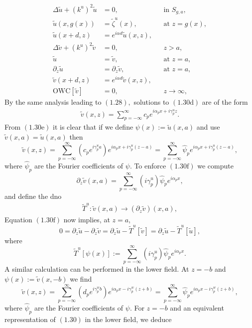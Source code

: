 \begin{subequations}
\begin{align}
\Delta \tilde{u} + (k^u)^2 \tilde{u} &=0,&& \text{in $S_{g,a}$},\\
\tilde{u}(x,g(x))&=\tilde{\zeta}^u(x),&& \text{at $z=g(x)$},\\
\tilde{u}(x+d,z)&=e^{i\alpha d}\tilde{u}(x,z),\\
\Delta \tilde{v} + (k^u)^2 \tilde{v} &=0, && z>a,\\
\tilde{u}&=\tilde{v}, && \text{at $z=a$},\\
\partial_z \tilde{u} &= \partial_z \tilde{v},&& \text{at $z=a$},\\
\tilde{v}(x+d,z)&=e^{i\alpha d}\tilde{v}(x,z),\\
\text{OWC}[\tilde{v}]&=0,&& z\to\infty,
\end{align}
\end{subequations}
By the same analysis leading to $(1.28),$ solutions to $(1.30\text{d})$ are of the form
\begin{align}
\tilde{v}(x,z)=\sum_{p=-\infty}^{\infty}c_pe^{i\alpha_px + i\gamma_p^u z}.   
\end{align}
From $(1.30\text{e})$ it is clear that if we define $\psi(x):=\tilde{u}(x,a)$ and use $\tilde{v}(x,a)=\tilde{u}(x,a)$ then
$$
\tilde{v}(x,z)=\sum_{p=-\infty}^{\infty}\left(c_pe^{i\gamma_p^ua}\right)e^{i\alpha_px + i\gamma_p^u (z-a)}=\sum_{p=-\infty}^{\infty}\hat{\psi}_pe^{i\alpha_px + i\gamma_p^u (z-a)},
$$
where $\hat{\psi}_p$ are the Fourier coefficients of $\psi$. To enforce $(1.30\text{f})$ we compute
$$\partial_z \tilde{v}(x,a)=\sum_{p=-\infty}^{\infty}\left(i\gamma_p^u\right)\hat{\psi}_pe^{i\alpha_px},$$
and define the \gls{dno}
\begin{align}
\tilde{T}^u:\tilde{v}(x,a) \to \left(\partial_z \tilde{v}\right)(x,a),    
\end{align}
Equation $(1.30\text{f})$ now implies, at $z=a$,
$$0=\partial_z \tilde{u} - \partial_z \tilde{v} = \partial_z \tilde{u} - \tilde{T}^u[\tilde{v}] = \partial_z \tilde{u} - \tilde{T}^u[\tilde{u}],$$
where $$\tilde{T}^u[\psi(x)] := \sum_{p=-\infty}^{\infty}\left(i\gamma_p^u\right)\hat{\psi}_pe^{i\alpha_px}.$$ A similar calculation can be performed in the lower field. At $z=-b$ and $\psi(x):=\tilde{v}(x,-b)$ we find
$$
\tilde{v}(x,z)=\sum_{p=-\infty}^{\infty}\left(d_pe^{i\gamma_p^wb}\right)e^{i\alpha_px - i\gamma_p^w (z+b)}=\sum_{p=-\infty}^{\infty}\hat{\psi}_pe^{i\alpha_px - i\gamma_p^w (z+b)},
$$
where $\hat{\psi}_p$ are the Fourier coefficients of $\psi.$ For $z=-b$ and an equivalent representation of $(1.30)$ in the lower field, we deduce
